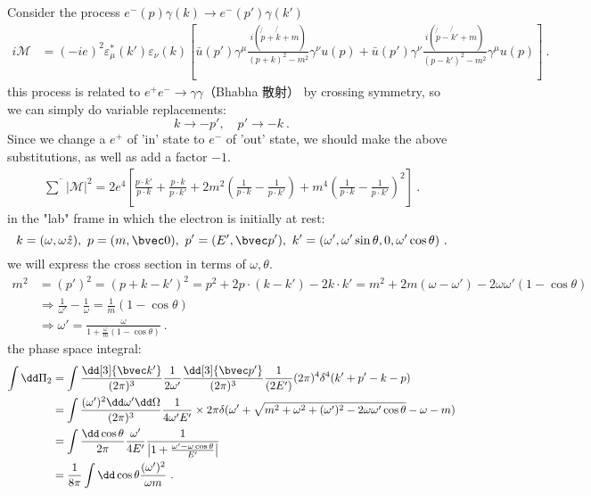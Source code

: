 

Consider the process $e^-(p)\gamma(k)\rightarrow e^-(p')\gamma(k')$
\begin{equation}\begin{aligned}
i\mathcal{M} &= (-ie)^2 \varepsilon_\mu^*(k')\varepsilon_\nu(k) \left[\bar u(p')\gamma^\mu \frac{i(\not{p}+\not{k}+m)}{(p+k)^2-m^2} \gamma^\nu u(p)+ 
\bar u(p')\gamma^\nu \frac{i(\not{p}-\not{k}'+m)}{(p-k')^2-m^2} \gamma^\mu u(p)
\right]~.
\end{aligned}\end{equation}
this process is related to  $e^+e^-\rightarrow \gamma\gamma$（Bhabha 散射） by crossing symmetry, so we can simply do variable replacements:
\[
k\rightarrow -p',\quad p'\rightarrow -k~.
\]
Since we change a $e^+$ of 'in' state to $e^-$ of 'out' state, we should make the above substitutions, as well as add a factor $-1$.
\begin{equation}\begin{aligned}
\overline{\sum}|\mathcal{M}|^2
=2e^4\left[\frac{p\cdot k'}{p\cdot k}+\frac{p\cdot k}{p\cdot k'}+2m^2\left(\frac{1}{p\cdot k}-\frac{1}{p\cdot k'}\right)+m^4\left(\frac{1}{p\cdot k}-\frac{1}{p\cdot k'}\right)^2\right]~.
\end{aligned}\end{equation}
in the "lab" frame in which the electron is initially at rest:
\[
k=(\omega,\omega \hat z), \ p=(m,\bvec 0),\ p'=(E',\bvec p'),\ k'=(\omega',\omega'\sin\theta,0,\omega'\cos\theta)~.
\]
we will express the cross section in terms of $\omega,\theta$.
\begin{equation}\begin{aligned}
m^2&=(p')^2=(p+k-k')^2=p^2+2p\cdot(k-k')-2k\cdot k'=m^2+2m(\omega-\omega')-2\omega\omega'(1-\cos\theta)\\
&\Rightarrow 
\frac{1}{\omega'}-\frac{1}{\omega}=\frac{1}{m}(1-\cos\theta)\\
&\Rightarrow \omega'=\frac{\omega}{1+\frac{\omega}{m}(1-\cos\theta)}~.
\end{aligned}\end{equation}
the phase space integral:
\begin{equation}\begin{aligned}
\int \dd \Pi_2 &= \int \frac{\dd[3]{\bvec k'}}{(2\pi)^3} \frac{1}{2\omega'} \frac{\dd[3]{\bvec p'}}{(2\pi)^3}\frac{1}{(2 E')}(2\pi)^4 \delta^4(k'+p'-k-p)\\
&=\int \frac{(\omega')^2\dd \omega' \dd \Omega}{(2\pi)^3} \frac{1}{4\omega'E'}\times 2\pi \delta(\omega'+\sqrt{m^2+\omega^2+(\omega')^2-2\omega\omega'\cos\theta}-\omega-m)\\
&=\int \frac{\dd \cos\theta}{2\pi}\frac{\omega'}{4E'}\frac{1}{\left|1+\frac{\omega'-\omega\cos\theta}{E'}\right|}\\
&=\frac{1}{8\pi}\int \dd \cos\theta\frac{(\omega')^2}{\omega m}~.
\end{aligned}\end{equation}
